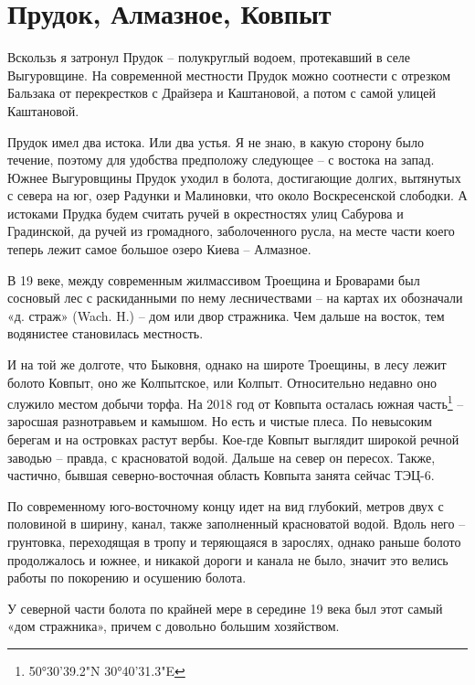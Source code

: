 \chapter{Прудок, Алмазное, Ковпыт}

Вскользь я затронул Прудок – полукруглый водоем, протекавший в селе Выгуровщине. На современной местности Прудок можно соотнести с отрезком Бальзака от перекрестков с Драйзера и Каштановой, а потом с самой улицей Каштановой.

Прудок имел два истока. Или два устья. Я не знаю, в какую сторону было течение, поэтому для удобства предположу следующее – с востока на запад. Южнее Выгуровщины Прудок уходил в болота, достигающие долгих, вытянутых с севера на юг, озер Радунки и Малиновки, что около Воскресенской слободки. А истоками Прудка будем считать ручей в окрестностях улиц Сабурова и Градинской, да ручей из громадного, заболоченного русла, на месте части коего теперь лежит самое большое озеро Киева – Алмазное.

В 19 веке, между современным жилмассивом Троещина и Броварами был сосновый лес с раскиданными по нему лесничествами – на картах их обозначали «д. страж» (Wach. H.) – дом или двор стражника. Чем дальше на восток, тем водянистее становилась местность.

И на той же долготе, что Быковня, однако на широте Троещины, в лесу лежит болото Ковпыт, оно же Колпытское, или Колпыт. Относительно недавно оно служило местом добычи торфа. На 2018 год от Ковпыта осталась южная часть\footnote{50°30'39.2"N 30°40'31.3"E} – заросшая разнотравьем и камышом. Но есть и чистые плеса. По невысоким берегам и на островках растут вербы. Кое-где Ковпыт выглядит широкой речной заводью – правда, с красноватой водой. Дальше на север он пересох. Также, частично, бывшая северно-восточная область Ковпыта занята сейчас ТЭЦ-6.

По современному юго-восточному концу идет на вид глубокий, метров двух с половиной в ширину, канал, также заполненный красноватой водой. Вдоль него – грунтовка, переходящая в тропу и теряющаяся в зарослях, однако раньше болото продолжалось и южнее, и никакой дороги и канала не было, значит это велись работы по покорению и осушению болота. 

У северной части болота по крайней мере в середине 19 века был этот самый «дом стражника», причем с довольно большим хозяйством.

